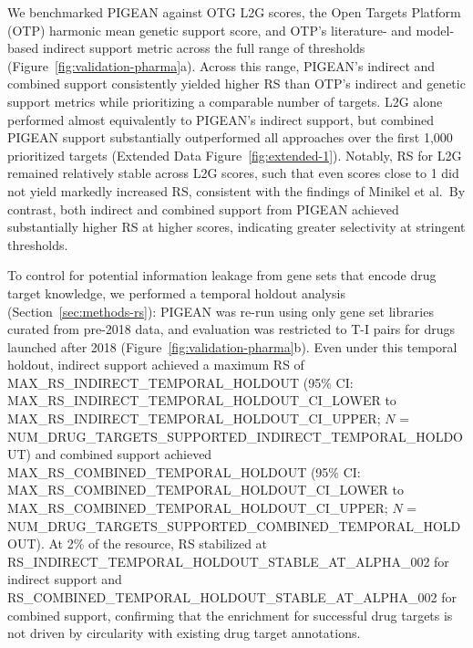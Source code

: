 We benchmarked PIGEAN against OTG L2G scores, the Open Targets Platform (OTP) harmonic mean genetic support score, and OTP's literature- and model-based indirect support metric across the full range of thresholds (Figure~\ref{fig:validation-pharma}a). Across this range, PIGEAN's indirect and combined support consistently yielded higher RS than OTP's indirect and genetic support metrics while prioritizing a comparable number of targets. L2G alone performed almost equivalently to PIGEAN's indirect support, but combined PIGEAN support substantially outperformed all approaches over the first 1,000 prioritized targets (Extended Data Figure~\ref{fig:extended-1}). Notably, RS for L2G remained relatively stable across L2G scores, such that even scores close to 1 did not yield markedly increased RS, consistent with the findings of Minikel et al.\ By contrast, both indirect and combined support from PIGEAN achieved substantially higher RS at higher scores, indicating greater selectivity at stringent thresholds.

To control for potential information leakage from gene sets that encode drug target knowledge, we performed a temporal holdout analysis (Section~\ref{sec:methods-rs}): PIGEAN was re-run using only gene set libraries curated from pre-2018 data, and evaluation was restricted to T-I pairs for drugs launched after 2018 (Figure~\ref{fig:validation-pharma}b). Even under this temporal holdout, indirect support achieved a maximum RS of {{MAX_RS_INDIRECT_TEMPORAL_HOLDOUT}} (95\% CI: {{MAX_RS_INDIRECT_TEMPORAL_HOLDOUT_CI_LOWER}} to {{MAX_RS_INDIRECT_TEMPORAL_HOLDOUT_CI_UPPER}}; $N$ = {{NUM_DRUG_TARGETS_SUPPORTED_INDIRECT_TEMPORAL_HOLDOUT}}) and combined support achieved {{MAX_RS_COMBINED_TEMPORAL_HOLDOUT}} (95\% CI: {{MAX_RS_COMBINED_TEMPORAL_HOLDOUT_CI_LOWER}} to {{MAX_RS_COMBINED_TEMPORAL_HOLDOUT_CI_UPPER}}; $N$ = {{NUM_DRUG_TARGETS_SUPPORTED_COMBINED_TEMPORAL_HOLDOUT}}). At 2\% of the resource, RS stabilized at {{RS_INDIRECT_TEMPORAL_HOLDOUT_STABLE_AT_ALPHA_002}} for indirect support and {{RS_COMBINED_TEMPORAL_HOLDOUT_STABLE_AT_ALPHA_002}} for combined support, confirming that the enrichment for successful drug targets is not driven by circularity with existing drug target annotations.
